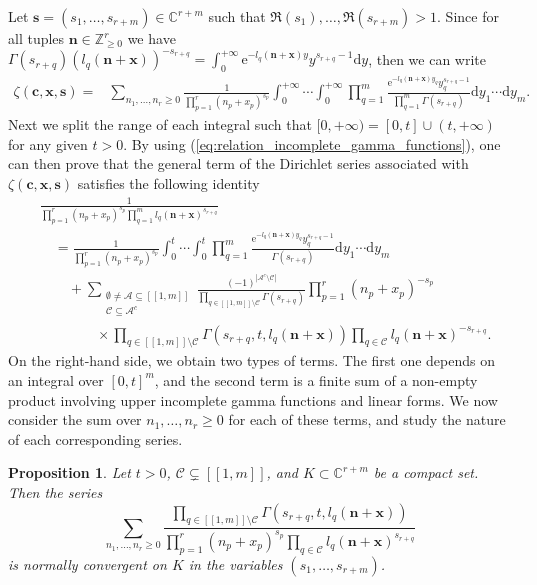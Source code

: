 \documentclass[a4paper]{amsart}
\newtheorem{proposition}[theorem]{Proposition}
\theoremstyle{remark}
\theoremstyle{definition}
\newcommand{\dd}{\mathrm{d}}
\newcommand{\phie}{\mathrm{e}}
\begin{document}
Let $\mathbf{s}=(s_1,\ldots, s_{r+m}) \in \mathbb{C}^{r+m}$ such that $\Re(s_{1}), \ldots, \Re(s_{r+m}) > 1$. Since for all tuples $\mathbf{n} \in \mathbb{Z}_{\geq 0}^{r}$ we have
$\Gamma(s_{r+q})(l_q(\mathbf{n}+\mathbf{x}))^{-s_{r+q}}=\int_0^{+\infty} \phie^{-l_q(\mathbf{n}+\mathbf{x})y} y^{s_{r+q}-1} \dd y$, then we can write
\begin{align*}
    \zeta(\mathbf{c},\mathbf{x},\mathbf{s}) =& \sum_{n_1,\ldots,n_r \geq 0} \frac{1}{\prod_{p=1}^r (n_p+x_p)^{s_p}}\int_{0}^{+\infty} \cdots \int_{0}^{+\infty} \prod_{q=1}^m \frac{\phie^{-l_q(\mathbf{n}+\mathbf{x})y_q} y_q^{s_{r+q}-1}}{\prod_{q=1}^m \Gamma(s_{r+q})} \dd y_1 \cdots \dd y_m.
\end{align*}
Next we split the range of each integral such that $[0,+\infty) = [0,t] \cup (t,+\infty)$ for any given $t>0$. By using (\ref{eq:relation_incomplete_gamma_functions}), one can then prove that the general term of the Dirichlet series associated with $\zeta(\mathbf{c},\mathbf{x},\mathbf{s})$ satisfies the following identity
\begin{align}
    &\frac{1}{\prod_{p=1}^r (n_p+x_p)^{s_p} \prod_{q=1}^m l_q(\mathbf{n}+\mathbf{x})^{s_{r+q}}} \nonumber \\
    & \quad = \frac{1}{\prod_{p=1}^r (n_p+x_p)^{s_p}} \int_{0}^{t} \cdots \int_{0}^{t} \prod_{q=1}^m \frac{\phie^{-l_q(\mathbf{n}+\mathbf{x})y_q} y_q^{s_{r+q}-1}}{\Gamma(s_{r+q})} \dd y_1 \cdots \dd y_m \label{eq:general_term_dirichlet_series_hurwitz_zeta}\\
    & \qquad + \sum_{\substack{\emptyset \neq \mathcal{A} \subseteq [\![1,m]\!] \\ \mathcal{C} \subseteq \mathcal{A}^c}} \frac{(-1)^{|\mathcal{A}^c \setminus \mathcal{C}|}}{\prod_{q \in [\![1,m]\!] \setminus \mathcal{C}} \Gamma(s_{r+q})} \prod_{p=1}^{r} (n_p+x_p)^{-s_p} \nonumber \\
    & \qquad \qquad \times \prod_{q \in [\![ 1,m ]\!] \setminus \mathcal{C}} \Gamma(s_{r+q},t,l_q(\mathbf{n}+\mathbf{x})) \prod_{q \in \mathcal{C}} l_q(\mathbf{n}+\mathbf{x})^{-s_{r+q}}. \nonumber
\end{align}
On the right-hand side, we obtain two types of terms. The first one depends on an integral over $[0,t]^m$, and the second term is a finite sum of a non-empty product involving upper incomplete gamma functions and linear forms. We now consider the sum over $n_1,\ldots,n_r \geq 0$ for each of these terms, and study the nature of each corresponding series.

\begin{proposition}
\label{prop:normally_convergent_incomplete_gamma}
Let $t>0$, $\mathcal{C} \subsetneq [\![ 1,m ]\!]$, and $K \subset \mathbb{C}^{r+m}$ be a compact set. Then the series
\begin{equation}
    \sum_{n_1,\ldots,n_{r} \geq 0} \frac{\prod_{q \in [\![ 1,m ]\!] \setminus \mathcal{C}} \Gamma(s_{r+q},t,l_q(\mathbf{n}+\mathbf{x}))}{\prod_{p=1}^{r} (n_p+x_p)^{s_p} \prod_{q \in \mathcal{C}} l_q(\mathbf{n}+\mathbf{x})^{s_{r+q}}} \label{eq:normally_convergent_incomplete_gamma}
\end{equation}
is normally convergent on $K$ in the variables $(s_1,\ldots,s_{r+m})$.
\end{proposition}
\end{document}
